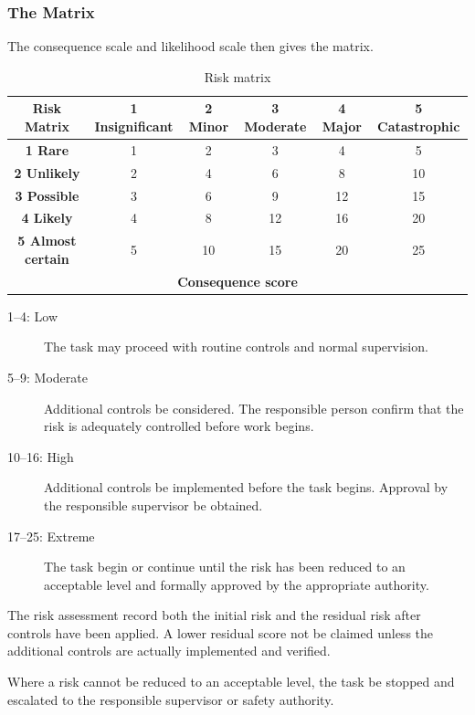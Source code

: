 \subsubsection{The Matrix}

The consequence scale and likelihood scale then gives the matrix.

\begin{table}[H]
\centering
\caption{Risk matrix}
\label{tab:risk-matrix}
\renewcommand{\arraystretch}{1.5}
\begin{tabular}{c|ccccc}
\textbf{Risk Matrix}
&
\textbf{1 Insignificant}
&
\textbf{2 Minor}
&
\textbf{3 Moderate}
&
\textbf{4 Major}
&
\textbf{5 Catastrophic}
\\
\hline
\textbf{1 Rare} & 1 & 2 & 3 & 4 & 5 \\
\textbf{2 Unlikely} & 2 & 4 & 6 & 8 & 10 \\
\textbf{3 Possible} & 3 & 6 & 9 & 12 & 15 \\
\textbf{4 Likely} & 4 & 8 & 12 & 16 & 20 \\
\textbf{5 Almost certain} & 5 & 10 & 15 & 20 & 25 \\
\hline
\multicolumn{6}{c}{\textbf{Consequence score}} \\
\end{tabular}
\end{table}


\begin{description}
    \item[1--4: Low] The task may proceed with routine controls and normal supervision.

    \item[5--9: Moderate] Additional controls \should{} be considered. The responsible person \must{} confirm that the risk is adequately controlled before work begins.

    \item[10--16: High] Additional controls \must{} be implemented before the task begins. Approval by the responsible supervisor \must{} be obtained.

    \item[17--25: Extreme] The task \mustnot{} begin or continue until the risk has been reduced to an acceptable level and formally approved by the appropriate authority.
\end{description}

The risk assessment \must{} record both the initial risk and the residual risk after controls have been applied. A lower residual score \must{} not be claimed unless the additional controls are actually implemented and verified.

Where a risk cannot be reduced to an acceptable level, the task \must{} be stopped and escalated to the responsible supervisor or safety authority.